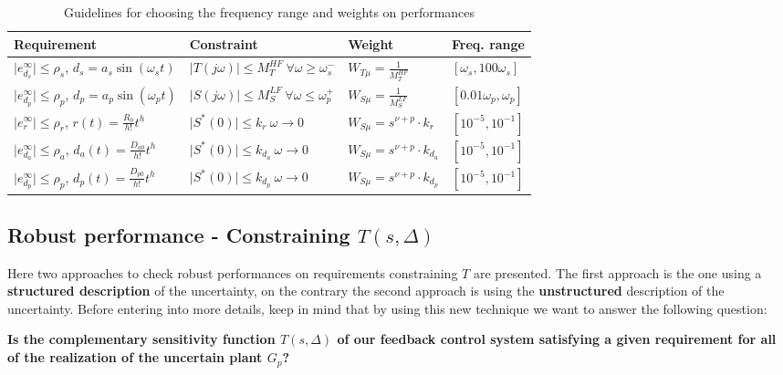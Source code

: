 \documentclass[a4paper, 12pt]{article}
\begin{document}
\begin{table}[h]
    \centering
    \begin{tabular}{p{5cm} p{5cm} p{3cm} p{3cm}}
        \midrule[1.5pt]
        \textbf{Requirement}&\textbf{Constraint}&\textbf{Weight}&\textbf{Freq. range}\\
        \midrule
        $\vert e_{d_s}^\infty \vert \le \rho_s$, $d_s=a_s\sin(\omega_s{t})$&$\vert T(j\omega) \vert \le M_T^{HF} \ \forall \omega \ge \omega_s^{-}$&$W_{T\mu}=\frac{1}{M_T^{HF}}$&$[\omega_s,100\omega_s]$\\
        \midrule
        $\vert e_{d_p}^\infty \vert \le \rho_p$, $d_p=a_p\sin(\omega_p{t})$&$\vert S(j\omega) \vert \le M_S^{LF} \ \forall \omega \le \omega_p^{+}$&$W_{S\mu}=\frac{1}{M_S^{LF}}$&$[0.01\omega_p,\omega_p]$\\
        \midrule
        $\vert e_r^\infty \vert \le \rho_r$, $r(t)=\frac{R_0}{h!}{t^h}$& $\vert S^{*}(0) \vert \le k_{r} \ \omega \to 0$&$W_{S\mu}=s^{\nu+p} \cdot k_{r}$&$[10^{-5},10^{-1}]$\\
        \midrule
        $\vert e_{d_a}^\infty \vert \le \rho_a$, $d_a(t)=\frac{D_{a0}}{h!}{t^h}$& $\vert S^{*}(0) \vert \le k_{d_a} \ \omega \to 0$&$W_{S\mu}=s^{\nu+p} \cdot k_{d_a}$&$[10^{-5},10^{-1}]$\\
        \midrule
        $\vert e_{d_p}^\infty \vert \le \rho_p$, $d_p(t)=\frac{D_{p0}}{h!}{t^h}$& $\vert S^{*}(0) \vert \le k_{d_p} \ \omega \to 0$&$W_{S\mu}=s^{\nu+p} \cdot k_{d_p}$&$[10^{-5},10^{-1}]$
    \end{tabular}
    \caption{Guidelines for choosing the frequency range and weights on performances}
    \label{tab:guideline}
\end{table}

\newpage
\subsection{Robust performance - Constraining $T(s,\Delta)$}
Here two approaches to check robust performances on requirements constraining $T$ are presented. The first approach is the one using a \textbf{structured description} of the uncertainty, on the contrary the second approach is using the \textbf{unstructured} description of the uncertainty. Before entering into more details, keep in mind that by using this new technique we want to answer the following question:
\begin{center}
    \textbf{Is the complementary sensitivity function $T(s,\Delta)$ of our feedback control system satisfying a given requirement for 
    all of the realization of the uncertain plant $G_p$?}
\end{center}
\end{document}
